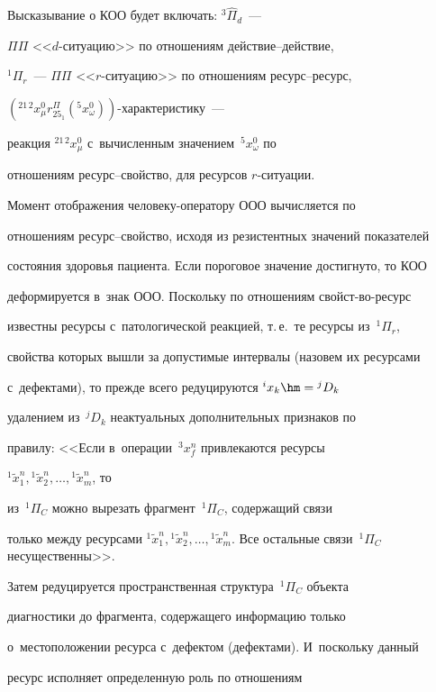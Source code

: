   

  Высказывание о КОО будет включать: ${}^3\hat{\Pi}_d$~--- 

$\Pi\Pi$ <<$d$-ситуацию>> по отношениям дей\-ст\-вие--дей\-ст\-вие, 

${}^1\Pi_r$~--- $\Pi\Pi$ <<$r$-си\-ту\-ацию>> по отношениям ре\-сурс--ре\-сурс, 

$({}^{21\,2}x^0_\mu r_{25_1}^{\Pi}({}^5 x^0_\omega))$-ха\-рак\-те\-ри\-сти\-ку~--- 

реакция ${}^{21\,2}x_\mu^0$ с~вычисленным значением~${}^5 x^0_\omega$ по 

отношениям ре\-сурс--свой\-ст\-во, для ресурсов $r$-си\-ту\-ации.

  

  Момент отображения че\-ло\-ве\-ку-опе\-ра\-то\-ру ООО вы\-чис\-ля\-ет\-ся по 

отношениям ре\-сурс--свойство, исходя из резистентных значений показателей 

состояния здоровья пациента. Если пороговое значение достигнуто, то КОО 

деформируется в~знак ООО. Поскольку по отношениям свой\-ст\--во-ре\-сурс 

известны ресурсы с~патологической реакцией, т.\,е.\ те ресурсы из~${}^1\Pi_r$, 

свойства которых вышли за допустимые интервалы (назовем их ресурсами 

с~дефектами), то прежде всего редуцируются ${}^i x_k\hm= {}^jD_k$ 

удалением из~${}^j D_k$ неактуальных дополнительных признаков по 

правилу: <<Если в~операции~${}^3x_f^n$ привлекаются ресурсы 

${}^1\tilde{x}_1^n, {}^1 \tilde{x}_2^n, \ldots , {}^1\tilde{x}_m^n$, то 

из~${}^1\Pi_C$ можно вырезать фрагмент~${}^1\Pi_C$, содержащий связи 

только между ресурсами ${}^1\tilde{x}_1^n, {}^1 \tilde{x}_2^n, \ldots , 

{}^1\tilde{x}_m^n$. Все остальные связи~${}^1\Pi_C$ несущественны>>. 

Затем редуцируется пространственная структура~${}^1\Pi_C$ объекта 

диагностики до фрагмента, содержащего информацию только 

о~местоположении ресурса с~дефектом (дефектами). И~поскольку данный 

ресурс исполняет определенную роль по отношениям  

